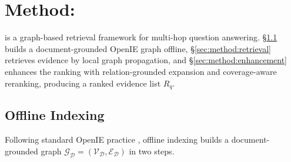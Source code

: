 %
%
%

\section{Method: \methodname{}}
\label{sec:method}

\methodname{} is a graph-based retrieval framework for multi-hop question
answering. \S\ref{sec:method:substrate} builds a document-grounded
OpenIE graph offline, \S\ref{sec:method:retrieval} retrieves evidence by
local graph propagation, and \S\ref{sec:method:enhancement} enhances the
ranking with relation-grounded expansion and coverage-aware reranking,
producing a ranked evidence list $R_q$.

\subsection{Offline Indexing}
\label{sec:method:substrate}

Following standard OpenIE practice
\citep{angeli2015leveraging,gutierrez2025hipporag}, offline indexing
builds a document-grounded graph
$\mathcal{G}_{\mathcal{D}}=(\mathcal{V}_{\mathcal{D}},\mathcal{E}_{\mathcal{D}})$
in two steps.

